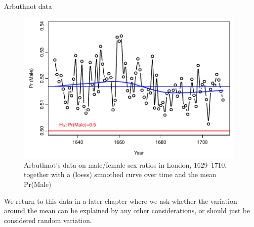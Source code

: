 \documentclass[11pt]{book}
\renewenvironment{knitrout}{\small\renewcommand{\baselinestretch}{.85}}{} %
\begin{document}
\begin{Example}[arbuthnot1]{Arbuthnot data}
\begin{knitrout}
\begin{figure}[!htbp]
\centerline{\includegraphics[width=.75\textwidth]{ch03/fig/arbuthnot1} }

\caption[Arbuthnot's data on male/female sex ratios]{Arbuthnot's data on male/female sex ratios in London, 1629--1710, together with a (loess) smoothed curve over time and the mean Pr(Male)\label{fig:arbuthnot1}}
\end{figure}


\end{knitrout}
We return to this data in a later chapter where we ask whether the variation around
the mean can be explained by any other considerations, or should just be considered 
random variation.
\end{Example}
\end{document}
